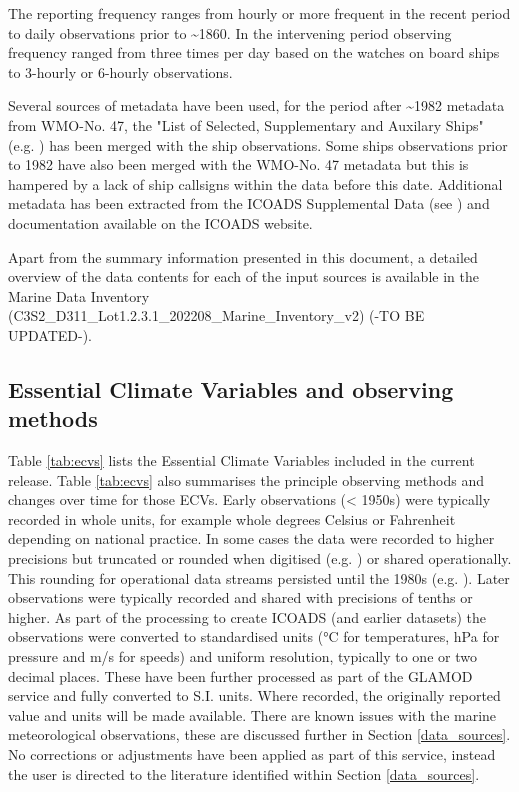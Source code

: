 The reporting frequency ranges from hourly or more frequent in the recent period to daily observations prior to \sim 1860. 
In the intervening period observing frequency ranged from three times per day based on the watches on board ships to 3-hourly or 6-hourly observations.

Several sources of metadata have been used, for the period after \sim 1982 metadata from WMO-No. 47, the "List of Selected, Supplementary and Auxilary Ships" (e.g. \cite{Kent2007}) has been merged with the ship observations.
Some ships observations prior to 1982 have also been merged with the WMO-No. 47 metadata but this is hampered by a lack of ship callsigns within the data before this date.
Additional metadata has been extracted from the ICOADS Supplemental Data (see \cite{Freeman2017}) and documentation available on the ICOADS website.

Apart from the summary information presented in this document, a detailed overview of the data contents for each of the input sources is available in the Marine Data Inventory \\
(C3S2\_D311\_Lot1.2.3.1\_202208\_Marine\_Inventory\_v2) (-TO BE UPDATED-).

\subsection{Essential Climate Variables and observing methods}

Table \ref{tab:ecvs} lists the Essential Climate Variables included in the current release. 
Table \ref{tab:ecvs} also summarises the principle observing methods and changes over time for those ECVs.
Early observations (< 1950s) were typically recorded in whole units, for example whole degrees Celsius or Fahrenheit depending on national practice.
In some cases the data were recorded to higher precisions but truncated or rounded when digitised (e.g. \cite{Chan2019}) or shared operationally. 
This rounding for operational data streams persisted until the 1980s (e.g. \cite{Willett2008}).
Later observations were typically recorded and shared with precisions of tenths or higher.
As part of the processing to create ICOADS (and earlier datasets) the observations were converted to standardised units (°C for temperatures, hPa for pressure and m/s for speeds) and uniform resolution, typically to one or two decimal places.
These have been further processed as part of the GLAMOD service and fully converted to S.I. units.
Where recorded, the originally reported value and units will be made available.
There are known issues with the marine meteorological observations, these are discussed further in Section \ref{data_sources}.
No corrections or adjustments have been applied as part of this service, instead the user is directed to the literature identified within Section \ref{data_sources}.

